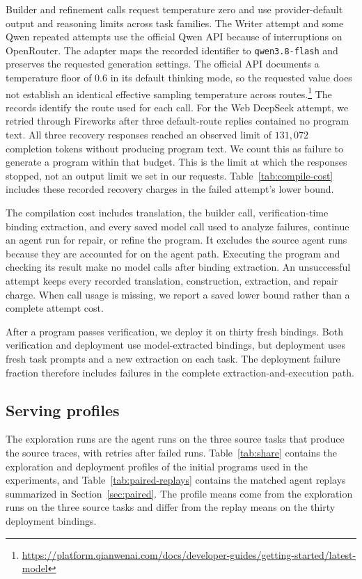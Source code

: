Builder and refinement calls request temperature zero and use provider-default output and reasoning limits across task families.
The Writer attempt and some Qwen repeated attempts use the official Qwen API because of interruptions on OpenRouter.
The adapter maps the recorded identifier to \texttt{qwen3.8-flash} and preserves the requested generation settings.
The official API documents a temperature floor of $0.6$ in its default thinking mode, so the requested value does not establish an identical effective sampling temperature across routes.\footnote{\url{https://platform.qianwenai.com/docs/developer-guides/getting-started/latest-model}}
The records identify the route used for each call.
For the Web DeepSeek attempt, we retried through Fireworks after three default-route replies contained no program text.
All three recovery responses reached an observed limit of $131{,}072$ completion tokens without producing program text.
We count this as failure to generate a program within that budget.
This is the limit at which the responses stopped, not an output limit we set in our requests.
Table~\ref{tab:compile-cost} includes these recorded recovery charges in the failed attempt's lower bound.

The compilation cost includes translation, the builder call, verification-time binding extraction, and every saved model call used to analyze failures, continue an agent run for repair, or refine the program.
It excludes the source agent runs because they are accounted for on the agent path.
Executing the program and checking its result make no model calls after binding extraction.
An unsuccessful attempt keeps every recorded translation, construction, extraction, and repair charge.
When call usage is missing, we report a saved lower bound rather than a complete attempt cost.

After a program passes verification, we deploy it on thirty fresh bindings.
Both verification and deployment use model-extracted bindings, but deployment uses fresh task prompts and a new extraction on each task.
The deployment failure fraction therefore includes failures in the complete extraction-and-execution path.

\subsection{Serving profiles}
\label{app:serving-profiles}
The exploration runs are the agent runs on the three source tasks that produce the source traces, with retries after failed runs.
Table~\ref{tab:share} contains the exploration and deployment profiles of the initial programs used in the experiments, and Table~\ref{tab:paired-replays} contains the matched agent replays summarized in Section~\ref{sec:paired}.
The profile means come from the exploration runs on the three source tasks and differ from the replay means on the thirty deployment bindings.



